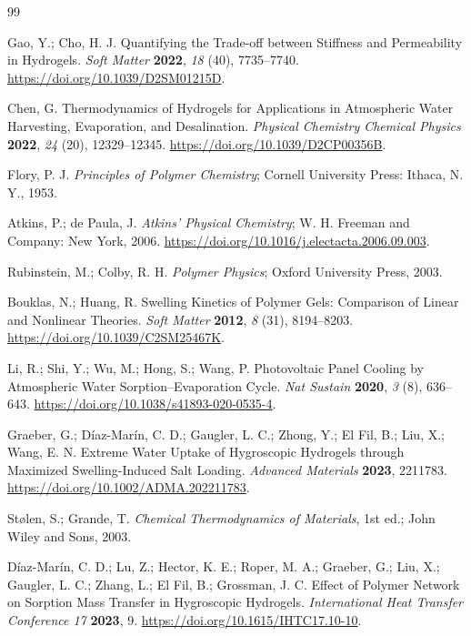 \documentclass[11pt]{article}
\begin{document}

\begin{thebibliography}{99}

 Gao, Y.; Cho, H. J. Quantifying the Trade-off between Stiffness and Permeability in Hydrogels. \textit{Soft Matter} \textbf{2022}, \textit{18} (40), 7735--7740. \url{https://doi.org/10.1039/D2SM01215D}.

 Chen, G. Thermodynamics of Hydrogels for Applications in Atmospheric Water Harvesting, Evaporation, and Desalination. \textit{Physical Chemistry Chemical Physics} \textbf{2022}, \textit{24} (20), 12329--12345. \url{https://doi.org/10.1039/D2CP00356B}.

 Flory, P. J. \textit{Principles of Polymer Chemistry}; Cornell University Press: Ithaca, N.\,Y., 1953.

 Atkins, P.; de Paula, J. \textit{Atkins' Physical Chemistry}; W. H. Freeman and Company: New York, 2006. \url{https://doi.org/10.1016/j.electacta.2006.09.003}.

 Rubinstein, M.; Colby, R. H. \textit{Polymer Physics}; Oxford University Press, 2003.

 Bouklas, N.; Huang, R. Swelling Kinetics of Polymer Gels: Comparison of Linear and Nonlinear Theories. \textit{Soft Matter} \textbf{2012}, \textit{8} (31), 8194--8203. \url{https://doi.org/10.1039/C2SM25467K}.

 Li, R.; Shi, Y.; Wu, M.; Hong, S.; Wang, P. Photovoltaic Panel Cooling by Atmospheric Water Sorption--Evaporation Cycle. \textit{Nat Sustain} \textbf{2020}, \textit{3} (8), 636--643. \url{https://doi.org/10.1038/s41893-020-0535-4}.

 Graeber, G.; D\'iaz-Mar\'in, C. D.; Gaugler, L. C.; Zhong, Y.; El Fil, B.; Liu, X.; Wang, E. N. Extreme Water Uptake of Hygroscopic Hydrogels through Maximized Swelling-Induced Salt Loading. \textit{Advanced Materials} \textbf{2023}, 2211783. \url{https://doi.org/10.1002/ADMA.202211783}.

 St{\o}len, S.; Grande, T. \textit{Chemical Thermodynamics of Materials}, 1st ed.; John Wiley and Sons, 2003.

 D\'iaz-Mar\'in, C. D.; Lu, Z.; Hector, K. E.; Roper, M. A.; Graeber, G.; Liu, X.; Gaugler, L. C.; Zhang, L.; El Fil, B.; Grossman, J. C. Effect of Polymer Network on Sorption Mass Transfer in Hygroscopic Hydrogels. \textit{International Heat Transfer Conference 17} \textbf{2023}, 9. \url{https://doi.org/10.1615/IHTC17.10-10}.


\end{thebibliography}
\end{document}
